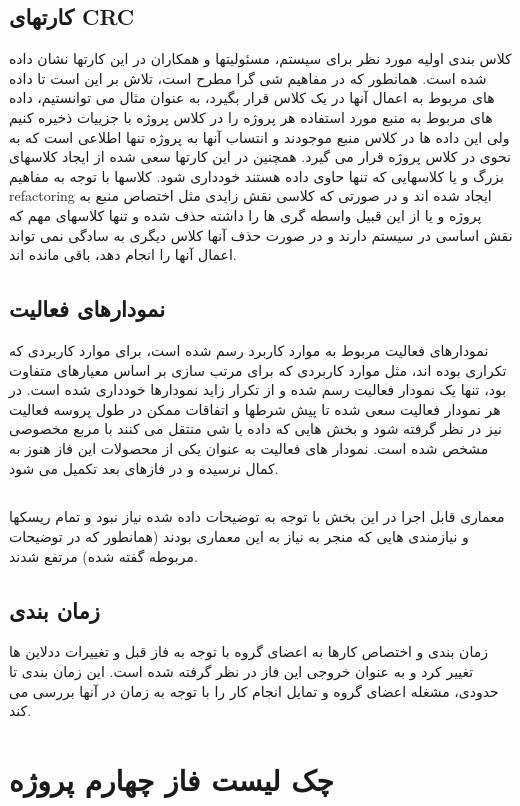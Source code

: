 \subsection*{کارتهای CRC}
کلاس بندی اولیه مورد نظر برای سیستم، مسئولیتها و همکاران در این کارتها نشان داده شده است. همانطور که در مفاهیم شی گرا مطرح است، تلاش بر این است تا داده های مربوط به اعمال آنها در یک کلاس قرار بگیرد، به عنوان مثال می توانستیم، داده های مربوط به منبع مورد استفاده هر پروژه را در کلاس پروژه با جزییات ذخیره کنیم ولی این داده ها در کلاس منبع موجودند و انتساب آنها به پروژه تنها اطلاعی است که به نحوی در کلاس پروژه قرار می گیرد. همچنین در این کارتها سعی شده از ایجاد کلاسهای بزرگ و یا کلاسهایی که تنها حاوی داده هستند خودداری شود. کلاسها با توجه به مفاهیم refactoring ایجاد شده اند و در صورتی که کلاسی نقش زایدی مثل اختصاص منبع به پروژه و یا از این قبیل واسطه گری ها را داشته حذف شده و تنها کلاسهای مهم که نقش اساسی در سیستم دارند و در صورت حذف آنها کلاس دیگری به سادگی نمی تواند اعمال آنها را انجام دهد، باقی مانده اند.
\subsection*{نمودارهای فعالیت}
نمودارهای فعالیت مربوط به موارد کاربرد رسم شده است، برای موارد کاربردی که تکراری بوده اند، مثل موارد کاربردی که برای مرتب سازی بر اساس معیارهای متفاوت بود، تنها یک نمودار فعالیت رسم شده و از تکرار زاید نمودارها خودداری شده است. در هر نمودار فعالیت سعی شده تا پیش شرطها و اتفاقات ممکن در طول پروسه فعالیت نیز در نظر گرفته شود و بخش هایی که داده یا شی منتقل می کنند با مربع مخصوصی مشخص شده است. نمودار های فعالیت به عنوان یکی از محصولات این فاز هنوز به کمال نرسیده و در فازهای بعد تکمیل می شود.
\subsection*{}
معماری قابل اجرا در این بخش با توجه به توضیحات داده شده نیاز نبود و تمام ریسکها و نیازمندی هایی که منجر به نیاز به این معماری بودند (همانطور که در توضیحات مربوطه گفته شده) مرتفع شدند.
\subsection*{زمان بندی}
زمان بندی و اختصاص کارها به اعضای گروه با توجه به فاز قبل و تغییرات ددلاین ها تغییر کرد و به عنوان خروجی این فاز در نظر گرفته شده است. این زمان بندی تا حدودی، مشغله اعضای گروه و تمایل انجام کار را با توجه به زمان در آنها بررسی می کند.

\newpage
\section{چک لیست فاز چهارم پروژه}

